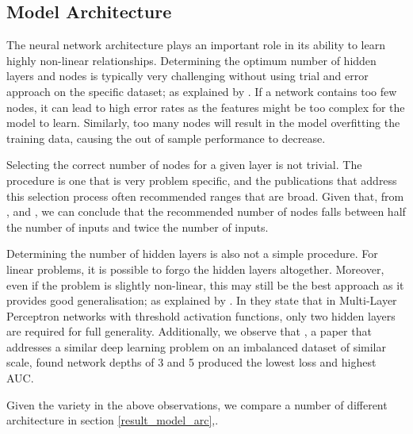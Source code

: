             
        \subsection{Model Architecture} \label{research_model_arc}
            The neural network architecture plays an important role in its ability to learn highly non-linear relationships. Determining the optimum number of hidden layers and nodes is typically very challenging without using trial and error approach on the specific dataset; as explained by \cite{book_bias_dilemma}. If a network contains too few nodes, it can lead to high error rates as the features might be too complex for the model to learn. Similarly, too many nodes will result in the model overfitting the training data, causing the out of sample performance to decrease.   
    
            Selecting the correct number of nodes for a given layer is not trivial. The procedure is one that is very problem specific, and the publications that address this selection process often recommended ranges that are broad. Given that, from \cite{book_bias_dilemma}, \cite{3_node_network} and \cite{nn_guide}, we can conclude that the recommended number of nodes falls between half the number of inputs and twice the number of inputs.    
            
            Determining the number of hidden layers is also not a simple procedure. For linear problems, it is possible to forgo the hidden layers altogether. Moreover, even if the problem is slightly non-linear, this may still be the best approach as it provides good generalisation; as explained by \cite{nn_guide}. In \cite{book_turing_nn} they state that in Multi-Layer Perceptron networks with threshold activation functions, only two hidden layers are required for full generality. Additionally, we observe that \cite{mortgage_risk}, a paper that addresses a similar deep learning problem on an imbalanced dataset of similar scale, found network depths of 3 and 5 produced the lowest loss and highest AUC. 
            
            
            
            Given the variety in the above observations, we compare a number of different architecture in section \ref{result_model_arc},.
            
            
            
   
            
            
            
            
    
    \clearpage
 

    
